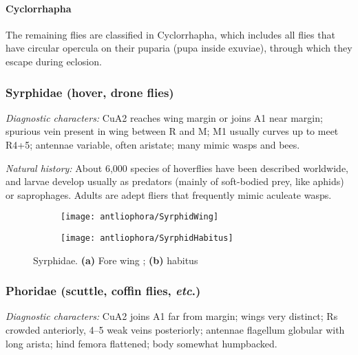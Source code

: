 \paragraph{Cyclorrhapha} The remaining flies are classified in Cyclorrhapha, which includes all flies that have circular opercula on their puparia (pupa inside exuviae), through which they escape during eclosion.

\subsubsection{Syrphidae (hover, drone flies)}
\noindent{}\textit{Diagnostic characters:} CuA2 reaches wing margin or joins A1 near margin; spurious vein present in wing between R and M; M1 usually curves up to meet R4+5; antennae variable, often aristate; many mimic wasps and bees.\vspace{3mm}

\noindent{}\textit{Natural history:} About 6,000 species of hoverflies have been described worldwide, and larvae develop usually as predators (mainly of soft-bodied prey, like aphids) or saprophages. Adults are adept fliers that frequently mimic aculeate wasps.

\begin{figure}[ht!]
    \centering
    \begin{subfigure}[ht!]{0.45\textwidth}
        \texttt{[image: antliophora/SyrphidWing]}
        \caption{}
        \label{fig:syrphid2}
    \end{subfigure}
    \qquad 
    \begin{subfigure}[ht!]{0.45\textwidth}
        \texttt{[image: antliophora/SyrphidHabitus]}
        \caption{}
        \label{fig:syrpidh1}
    \end{subfigure}
    \caption{Syrphidae. \textbf{(a)} Fore wing \citep[][Fig. 52.52]{mcalpine1981manualv2}; \textbf{(b)} habitus \citep[][Fig. 52.1]{mcalpine1981manualv2}}\label{fig:syrphids}
\end{figure}

\subsubsection{Phoridae (scuttle, coffin flies, \textit{etc}.)}
\noindent{}\textit{Diagnostic characters:} CuA2 joins A1 far from margin; wings very distinct; Rs crowded anteriorly, 4--5 weak veins posteriorly; antennae flagellum globular with long arista; hind femora flattened; body somewhat humpbacked.\vspace{3mm}

